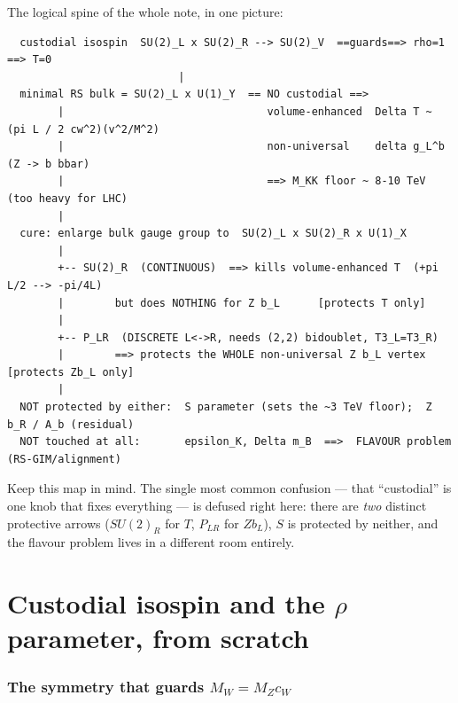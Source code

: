 \documentclass[11pt]{article}
\newcommand{\cw}{c_W}
\newcommand{\SUR}{SU(2)_R}
\newcommand{\PLR}{P_{LR}}
\newcommand{\rhoparam}{\rho}
\theoremstyle{definition}
\begin{document}
\noindent The logical spine of the whole note, in one picture:
\begin{footnotesize}
\begin{verbatim}
  custodial isospin  SU(2)_L x SU(2)_R --> SU(2)_V  ==guards==> rho=1 ==> T=0
                           |
  minimal RS bulk = SU(2)_L x U(1)_Y  == NO custodial ==>
        |                                volume-enhanced  Delta T ~ (pi L / 2 cw^2)(v^2/M^2)
        |                                non-universal    delta g_L^b   (Z -> b bbar)
        |                                ==> M_KK floor ~ 8-10 TeV  (too heavy for LHC)
        |
  cure: enlarge bulk gauge group to  SU(2)_L x SU(2)_R x U(1)_X
        |
        +-- SU(2)_R  (CONTINUOUS)  ==> kills volume-enhanced T  (+pi L/2 --> -pi/4L)
        |        but does NOTHING for Z b_L      [protects T only]
        |
        +-- P_LR  (DISCRETE L<->R, needs (2,2) bidoublet, T3_L=T3_R)
        |        ==> protects the WHOLE non-universal Z b_L vertex   [protects Zb_L only]
        |
  NOT protected by either:  S parameter (sets the ~3 TeV floor);  Z b_R / A_b (residual)
  NOT touched at all:       epsilon_K, Delta m_B  ==>  FLAVOUR problem  (RS-GIM/alignment)
\end{verbatim}
\end{footnotesize}
\noindent Keep this map in mind. The single most common confusion --- that
``custodial'' is one knob that fixes everything --- is defused right here: there
are \emph{two} distinct protective arrows ($\SUR$ for $T$, $\PLR$ for $Zb_L$),
$S$ is protected by neither, and the flavour problem lives in a different room
entirely.

\part{Custodial isospin and the $\rhoparam$ parameter, from scratch}
\label{part:why}

\section{The symmetry that guards $M_W = M_Z\cw$}
\label{sec:custodial}
\end{document}
